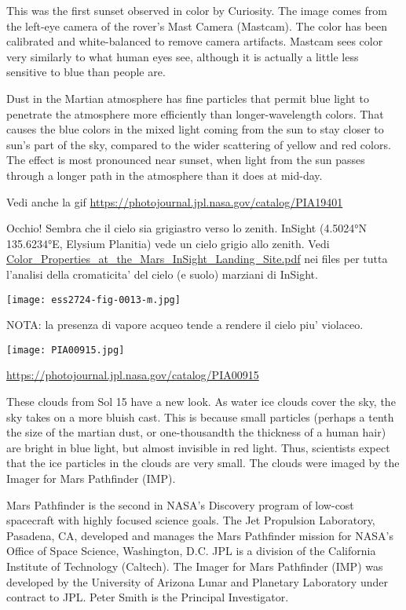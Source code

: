 \documentclass[a4paper,10pt,openany,oneside]{memoir}
\begin{document}
This was the first sunset observed in color by Curiosity. The image comes from the left-eye camera of the rover's Mast Camera (Mastcam). The color has been calibrated and white-balanced to remove camera artifacts. Mastcam sees color very similarly to what human eyes see, although it is actually a little less sensitive to blue than people are.

Dust in the Martian atmosphere has fine particles that permit blue light to penetrate the atmosphere more efficiently than longer-wavelength colors. That causes the blue colors in the mixed light coming from the sun to stay closer to sun's part of the sky, compared to the wider scattering of yellow and red colors. The effect is most pronounced near sunset, when light from the sun passes through a longer path in the atmosphere than it does at mid-day. 

Vedi anche la gif \url{https://photojournal.jpl.nasa.gov/catalog/PIA19401}

Occhio! Sembra che il cielo sia grigiastro verso lo zenith. InSight (4.5024°N 135.6234°E, Elysium Planitia) vede un cielo grigio allo zenith. Vedi \url{Color_Properties_at_the_Mars_InSight_Landing_Site.pdf} nei files per tutta l'analisi della cromaticita' del cielo (e suolo) marziani di InSight.

\texttt{[image: ess2724-fig-0013-m.jpg]}

NOTA: la presenza di vapore acqueo tende a rendere il cielo piu' violaceo.

\texttt{[image: PIA00915.jpg]}

\url{https://photojournal.jpl.nasa.gov/catalog/PIA00915}

These clouds from Sol 15 have a new look. As water ice clouds cover the sky, the sky takes on a more bluish cast. This is because small particles (perhaps a tenth the size of the martian dust, or one-thousandth the thickness of a human hair) are bright in blue light, but almost invisible in red light. Thus, scientists expect that the ice particles in the clouds are very small. The clouds were imaged by the Imager for Mars Pathfinder (IMP).

Mars Pathfinder is the second in NASA's Discovery program of low-cost spacecraft with highly focused science goals. The Jet Propulsion Laboratory, Pasadena, CA, developed and manages the Mars Pathfinder mission for NASA's Office of Space Science, Washington, D.C. JPL is a division of the California Institute of Technology (Caltech). The Imager for Mars Pathfinder (IMP) was developed by the University of Arizona Lunar and Planetary Laboratory under contract to JPL. Peter Smith is the Principal Investigator.
\end{document}
